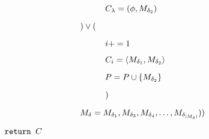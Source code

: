 \documentclass{article}
\begin{document}
	$\indent\indent\indent\indent\indent\indent\indent\indent C_{\lambda} = (\phi, M_{\delta_{2}})$
	
	$\indent\indent\indent\indent\indent\indent ) \lor ($
	
	$\indent\indent\indent\indent\indent\indent\indent\indent i += 1$
	
	$\indent\indent\indent\indent\indent\indent\indent\indent C_i = \left\langle M_{\delta_{1}}, M_{\delta_{2}} \right\rangle$
	
	$\indent\indent\indent\indent\indent\indent\indent\indent P = P \cup \{ M_{\delta_{2}}\}$
	
	$\indent\indent\indent\indent\indent\indent\indent\indent )$
	
	$\indent\indent\indent\indent\indent\indent M_{\delta} = M_{\delta_{1}},M_{\delta_{3}},M_{\delta_{4}},\ldots,M_{\delta_{\mid M_{\delta} \mid}}))$
	
	$\verb|return | C$
\end{document}
